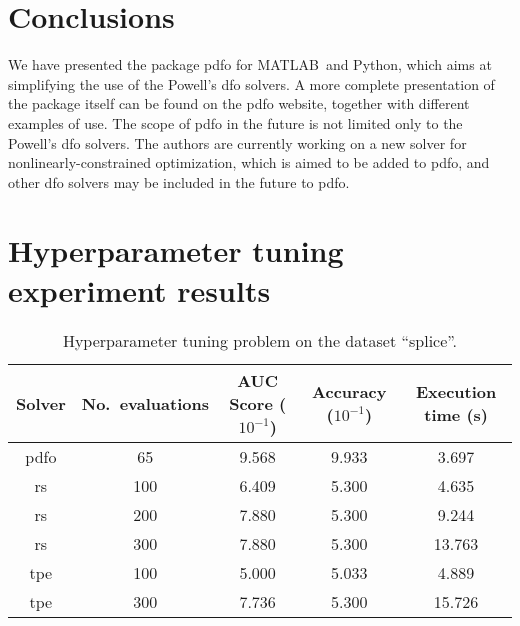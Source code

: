 \documentclass[11pt,draft]{article}
\numberwithin{equation}{section}
\def\matlab{\mbox{MATLAB}}
\def\python{\mbox{Python}}
\begin{document}
\section{Conclusions}

We have presented the package \gls{pdfo} for \matlab\ and \python, which aims at simplifying the use of the Powell's \gls{dfo} solvers.
A more complete presentation of the package itself can be found on the \gls{pdfo} website, together with different examples of use.
The scope of \gls{pdfo} in the future is not limited only to the Powell's \gls{dfo} solvers.
The authors are currently working on a new solver for nonlinearly-constrained optimization, which is aimed to be added to \gls{pdfo}, and other \gls{dfo} solvers may be included in the future to \gls{pdfo}.


\appendix

\section{Hyperparameter tuning experiment results}
\label{sec:htres}

\begin{table}[!ht]
    \caption{Hyperparameter tuning problem on the dataset \enquote{splice}.}
    \centering
    \begin{tabular}{cS[table-parse-only]SSS}
        \toprule
        Solver                          &
            {No.\ evaluations}              &
            {AUC Score ($10^{-1}$)}         &
            {Accuracy ($10^{-1}$)}          &
            {Execution time (\si{\second})}\\
        \midrule
        \gls{pdfo}  & 65    & 9.568 & 9.933 & 3.697\\
        \gls{rs}    & 100   & 6.409 & 5.300 & 4.635\\
        \gls{rs}    & 200   & 7.880 & 5.300 & 9.244\\
        \gls{rs}    & 300   & 7.880 & 5.300 & 13.763\\
        \gls{tpe}   & 100   & 5.000 & 5.033 & 4.889\\
        \gls{tpe}   & 300   & 7.736 & 5.300 & 15.726\\
        \bottomrule
    \end{tabular}
\end{table}
\end{document}

